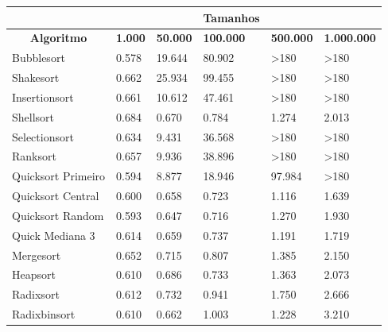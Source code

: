 \documentclass{article}
\begin{document}
\begin{flushleft}
\begin{itemize}
\begin{table}[ht]
\begin{tabular}{l|lllll|}
\cline{2-6}
                                                  &                &           &    \textbf{Tamanhos}& &         \\ \hline
\multicolumn{1}{|c|}{\textbf{Algoritmo}} & \textbf{1.000} & \textbf{50.000} & \textbf{100.000} & \textbf{500.000} & \textbf{1.000.000} \\ \hline
\multicolumn{1}{|l|}{Bubblesort}         & 0.578          & 19.644          & 80.902           & \textgreater180  & \textgreater180    \\ \hline
\multicolumn{1}{|l|}{Shakesort}          & 0.662          & 25.934          & 99.455           & \textgreater180  & \textgreater180    \\ \hline
\multicolumn{1}{|l|}{Insertionsort}      & 0.661          & 10.612          & 47.461           & \textgreater180  & \textgreater180    \\ \hline
\multicolumn{1}{|l|}{Shellsort}          & 0.684          & 0.670           & 0.784            & 1.274            & 2.013              \\ \hline
\multicolumn{1}{|l|}{Selectionsort}      & 0.634          & 9.431           & 36.568           & \textgreater180  & \textgreater180    \\ \hline
\multicolumn{1}{|l|}{Ranksort}           & 0.657          & 9.936           & 38.896           & \textgreater180  & \textgreater180    \\ \hline
\multicolumn{1}{|l|}{Quicksort Primeiro} & 0.594          & 8.877           & 18.946           & 97.984           & \textgreater180    \\ \hline
\multicolumn{1}{|l|}{Quicksort Central}  & 0.600          & 0.658           & 0.723            & 1.116            & 1.639              \\ \hline
\multicolumn{1}{|l|}{Quicksort Random}   & 0.593          & 0.647           & 0.716            & 1.270            & 1.930              \\ \hline
\multicolumn{1}{|l|}{Quick Mediana 3}    & 0.614          & 0.659           & 0.737            & 1.191            & 1.719              \\ \hline
\multicolumn{1}{|l|}{Mergesort}          & 0.652          & 0.715           & 0.807            & 1.385            & 2.150              \\ \hline
\multicolumn{1}{|l|}{Heapsort}           & 0.610          & 0.686           & 0.733            & 1.363            & 2.073              \\ \hline
\multicolumn{1}{|l|}{Radixsort}          & 0.612          & 0.732           & 0.941            & 1.750            & 2.666              \\ \hline
\multicolumn{1}{|l|}{Radixbinsort}       & 0.610          & 0.662           & 1.003            & 1.228            & 3.210              \\ \hline
\end{tabular}
\end{table}


\end{itemize}
\end{flushleft}
\end{document}
